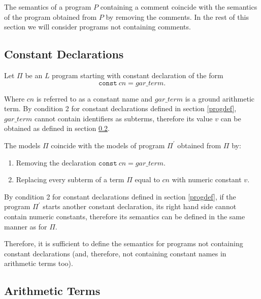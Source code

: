\documentclass[a4paper,10pt]{article}
\begin{document}
The semantics of a program $P$ containing a comment coincide with the semantics of the program obtained from $P$ by removing the comments. In the rest of this section we will consider programs not containing comments.




\subsection{Constant Declarations} \label{constants}


Let $\Pi$ be an $L$ program starting with constant declaration of the form
$$\texttt{const} ~cn = gar\_term.$$

Where $cn$ is referred to as a constant name and $gar\_term$ is a ground arithmetic term.
By condition 2 for constant declarations defined in section \ref{progdef}, $gar\_term$ cannot contain identifiers as subterms,
therefore its value $v$ can be obtained as defined in section \ref{at}. 

The models $\Pi$ coincide with the models of program $\Pi^\prime$ obtained from $\Pi$ by:
\begin{enumerate}
\item Removing the declaration $\texttt{const}~cn = gar\_term.$
\item Replacing every subterm of a term $\Pi$ equal to $cn$ with numeric constant $v$. 
\end{enumerate} 


\medskip\noindent
By condition 2 for constant declarations defined in section \ref{progdef}, if the program $\Pi^\prime$ starts another constant declaration, its right hand side cannot contain numeric constants, therefore its semantics can be defined in the same manner as for $\Pi$.

\medskip\noindent
Therefore, it is sufficient to define the semantics for programs not containing constant declarations (and, therefore, not containing constant names in arithmetic terms too).

\subsection{Arithmetic Terms}\label{at}
\end{document}
